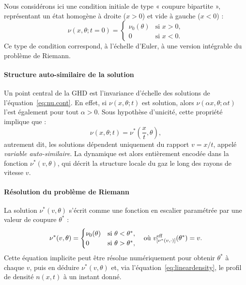 Nous considérons ici une condition initiale de type « coupure bipartite », représentant un état homogène à droite ($x>0$) et vide à gauche ($x<0$) :
\begin{equation}
    \label{eq:nu.cont.init}
    \nu(x,\theta;t=0) = 
    \begin{cases}
        \nu_0(\theta) & \text{si } x > 0, \\
        0 & \text{si } x < 0.
    \end{cases}
\end{equation}
Ce type de condition correspond, à l’échelle d’Euler, à une version intégrable du problème de Riemann.

\paragraph{Structure auto-similaire de la solution}

Un point central de la GHD est l’invariance d’échelle des solutions de l’équation~\eqref{eq:nu.cont}. En effet, si $\nu(x,\theta;t)$ est solution, alors $\nu(\alpha x, \theta; \alpha t)$ l’est également pour tout $\alpha > 0$. Sous hypothèse d’unicité, cette propriété implique que :
\begin{equation}
    \nu(x,\theta;t) = \nu^*\left(\frac{x}{t},\theta\right),
    \label{eq:nuvsnuetoile}
\end{equation}
autrement dit, les solutions dépendent uniquement du rapport $v = x/t$, appelé \emph{variable auto-similaire}. La dynamique est alors entièrement encodée dans la fonction $\nu^*(v,\theta)$, qui décrit la structure locale du gaz le long des rayons de vitesse $v$.

\paragraph{Résolution du problème de Riemann}

La solution $\nu^*(v,\theta)$ s’écrit comme une fonction en escalier paramétrée par une valeur de coupure $\theta^*$ :
\begin{equation}
    \label{eq:nuetoile}
    \nu^*(v,\theta) = 
    \begin{cases}
        \nu_0(\theta) & \text{si } \theta < \theta^*, \\
        0 & \text{si } \theta > \theta^*,
    \end{cases}
    \quad \text{où } v^{\rm eff}_{[\nu^*(v,\cdot)]}(\theta^*) = v.
\end{equation}
Cette équation implicite peut être résolue numériquement pour obtenir $\theta^*$ à chaque $v$, puis en déduire $\nu^*(v,\theta)$ et, via l’équation~\eqref{eq:lineardensity}, le profil de densité $n(x,t)$ à un instant donné.

